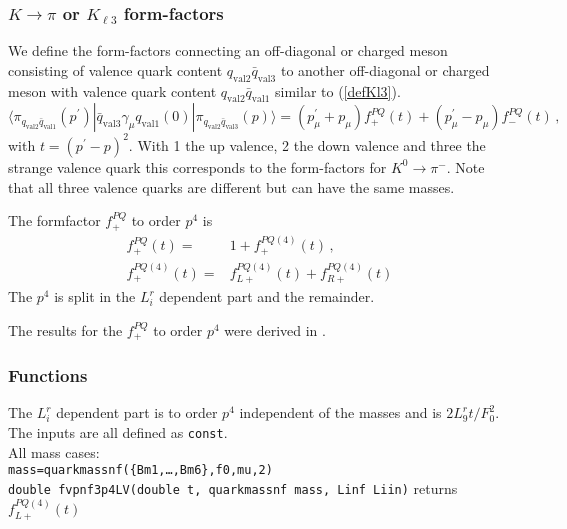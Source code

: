 \documentclass[12pt,a4paper]{article}
\newcommand{\mytt}[1]{\texttt{#1}}
\newcommand{\newfunction}[1]{\mytt{#1}\index{\mytt{#1}}}
\begin{document}
\subsubsection{$K\to\pi$ or $K_{\ell3}$ form-factors}

We define the form-factors connecting an off-diagonal or charged meson
consisting of valence quark content $q_{\mathrm{val}2}\bar q_{ \mathrm{val}3}$
to another off-diagonal or charged meson with valence quark
content $q_{\mathrm{val}2}\bar q_{ \mathrm{val}1}$ similar to
(\ref{defKl3}).
\begin{equation}
\label{defKl3PQ}
\langle \pi_{q_{\mathrm{val}2}\bar q_{ \mathrm{val}1}}(p^\prime) |
    \bar q_{\mathrm{val}3}\gamma_\mu q_{\mathrm{val}1}(0) 
     |  \pi_{q_{\mathrm{val}2}\bar q_{ \mathrm{val}3}}(p)\rangle
= \left(p^\prime_\mu + p_\mu\right) f^{PQ}_+(t)
  +\left(p^\prime_\mu - p_\mu\right) f^{PQ}_-(t)\,,
\end{equation}
with $t = (p^\prime-p)^2$. With 1 the up valence, 2 the down valence
and three the strange valence quark this corresponds to the
form-factors for $K^0\to \pi^-$.
Note that all three valence quarks are different but can have the same masses.

The formfactor $f^{PQ}_+$ to order $p^4$ is
\begin{align}
f^{PQ}_+(t) =& 1+ f^{PQ(4)}_+(t)\,,\nonumber\\
f^{PQ(4)}_+(t) =&f^{PQ(4)}_{L+}(t)+f^{PQ(4)}_{R+}(t)
\end{align}
The $p^4$ is split in the $L_i^r$ dependent part and the remainder.

The results for the $f_+^{PQ}$ to order $p^4$ were derived
in \cite{Bernard:2013eya}.

\subsubsection{Functions}

The $L_i^r$ dependent part is to order $p^4$ independent of the masses
and is $2 L_9^r t /F_0^2$.\\

The inputs are all defined as \mytt{const}.\\

All mass cases:\\
\mytt{mass=quarkmassnf(\{Bm1,\ldots,Bm6\},f0,mu,2)}\\
\mytt{double \newfunction{fvpnf3p4LV}(double t, quarkmassnf mass, Linf Liin)} returns $f^{PQ(4)}_{L+}(t)$\\
\end{document}
